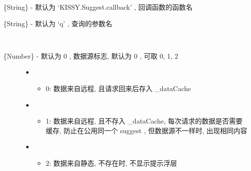 \documentclass[letterpaper,10pt,english]{sphinxmanual}
\begin{document}

\begin{fulllineitems}
\label{api/component/suggest/index:Suggest.callbackFn}
\{String\} - 默认为 `KISSY.Suggest.callback' , 回调函数的函数名

\end{fulllineitems}



\begin{fulllineitems}
\label{api/component/suggest/index:Suggest.queryName}
\{String\} - 默认为 `q' , 查询的参数名

\end{fulllineitems}



\begin{fulllineitems}
\label{api/component/suggest/index:Suggest.dataType}~\begin{description}
\item[{\{Number\} - 默认为 0 , 数据源标志, 默认为 0 , 可取 0, 1, 2}] \leavevmode\begin{itemize}
\item {} \begin{itemize}
\item {}
0: 数据来自远程, 且请求回来后存入 \_dataCache

\end{itemize}

\item {} \begin{itemize}
\item {}
1: 数据来自远程, 且不存入 \_dataCache, 每次请求的数据是否需要缓存, 防止在公用同一个 suggest , 但数据源不一样时, 出现相同内容

\end{itemize}

\item {} \begin{itemize}
\item {}
2: 数据来自静态, 不存在时, 不显示提示浮层

\end{itemize}

\end{itemize}

\end{description}

\end{fulllineitems}
\end{document}
